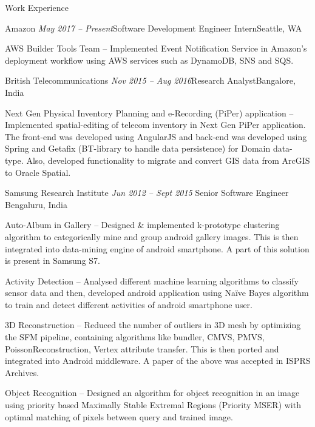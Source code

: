 \documentclass{resume} %
\begin{document}

\begin{rSection}{Work Experience}


\begin{rSubsection}{Amazon}{\emph{ May 2017 -- Present}}{Software Development Engineer Intern}{Seattle, WA}
\item AWS Builder Tools Team -- Implemented Event Notification Service in Amazon's deployment workflow using AWS services such as DynamoDB, SNS and SQS. 
\end{rSubsection}


\begin{rSubsection}{British Telecommunications}{\emph{ Nov 2015 -- Aug 2016}}{Research Analyst}{Bangalore, India}
\item Next Gen Physical Inventory Planning and e-Recording (PiPer) application -- Implemented spatial-editing of telecom inventory in Next Gen PiPer application. The front-end was developed using AngularJS and back-end was developed using Spring and Getafix (BT-library to handle data persistence) for Domain data-type. Also, developed functionality to migrate and convert GIS data from ArcGIS to Oracle Spatial.
\end{rSubsection}


\begin{rSubsection}{Samsung Research Institute} {\emph{Jun 2012 -- Sept 2015}} {Senior Software Engineer}
{Bengaluru, India}
\item Auto-Album in Gallery -- Designed \& implemented k-prototype clustering algorithm to categorically mine and group android gallery images. This is then integrated into data-mining engine of android smartphone. A part of this solution is present in Samsung S7.
\item Activity Detection -- Analysed different machine learning algorithms to classify sensor data and then, developed android application using Naïve Bayes algorithm to train and detect different activities of android smartphone user.
\item 3D Reconstruction -- Reduced the number of outliers in 3D mesh by optimizing the SFM pipeline, containing algorithms like bundler, CMVS, PMVS, PoissonReconstruction, Vertex attribute transfer. This is then ported and integrated into Android middleware. A paper of the above was accepted in ISPRS Archives.
\item Object Recognition -- Designed an algorithm for object recognition in an image using priority based Maximally Stable Extremal Regions (Priority MSER) with optimal matching of pixels between query and trained image.


\end{rSubsection}
\end{rSection}
\end{document}

